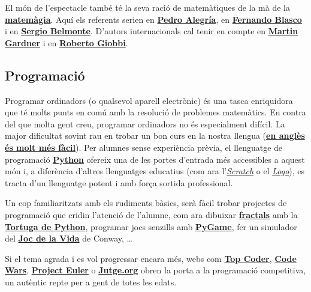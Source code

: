\documentclass[a4paper, 12pt]{article}
\begin{document}
            El món de l'espectacle també té la seva ració de matemàtiques de la mà de la \href{https://ca.wikipedia.org/wiki/Matem\%C3\%A0gia}{\textbf{matemàgia}}. Aquí els referents serien en \href{http://www.ehu.eus/~mtpalezp/}{\textbf{Pedro Alegría}}, en \href{http://fblasco.net/}{\textbf{Fernando Blasco}} i en \href{https://magiaymatematicas.blogspot.com/}{\textbf{Sergio Belmonte}}. D'autors internacionals cal tenir en compte en \href{https://ca.wikipedia.org/wiki/Martin_Gardner}{\textbf{Martin Gardner}} i en \href{https://en.wikipedia.org/wiki/Roberto_Giobbi}{\textbf{Roberto Giobbi}}.

        \subsection*{Programació}

            Programar ordinadors (o qualsevol aparell electrònic) és una tasca enriquidora que té molts punts en comú amb la resolució de problemes matemàtics. En contra del que molta gent creu, programar ordinadors no és especialment difícil. La major dificultat sovint rau en trobar un bon curs en la nostra llengua (\href{https://www.sololearn.com/Course/Python/}{\textbf{en anglès és molt més fàcil}}). Per alumnes sense experiència prèvia, el llenguatge de programació \href{https://ca.wikipedia.org/wiki/Python}{\textbf{Python}} ofereix una de les portes d'entrada més accessibles a aquest món i, a diferència d'altres llenguatges educatius (com ara l'\href{https://ca.wikipedia.org/wiki/Scratch_(llenguatge_de_programaci\%C3\%B3)}{\emph{Scratch}} o el \href{https://ca.wikipedia.org/wiki/Llenguatge_de_programaci\%C3\%B3_Logo}{\emph{Logo}}), es tracta d'un llenguatge potent i amb força sortida professional.

            Un cop familiaritzats amb els rudiments bàsics, serà fàcil trobar projectes de programació que cridin l'atenció de l'alumne, com ara dibuixar \href{https://ca.wikipedia.org/wiki/Fractal}{\textbf{fractals}} amb la \href{https://opentechschool.github.io/python-beginners/es_CL/simple_drawing.html}{\textbf{Tortuga de Python}}, programar jocs senzills amb \href{https://www.pygame.org/}{\textbf{PyGame}}, fer un simulador del \href{https://ca.wikipedia.org/wiki/Joc_de_la_vida}{\textbf{Joc de la Vida}} de Conway, \dots

            Si el tema agrada i es vol progressar encara més, webs com \href{https://www.topcoder.com/community/arena}{\textbf{Top Coder}}, \href{https://www.codewars.com/}{\textbf{Code Wars}}, \href{https://projecteuler.net/}{\textbf{Project Euler}} o \href{https://jutge.org/}{\textbf{Jutge.org}} obren la porta a la programació competitiva, un autèntic repte per a gent de totes les edats.
\end{document}
